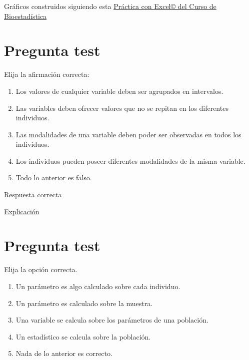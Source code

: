 \documentclass[
]{book}
\providecommand{\tightlist}{%
  \setlength{\itemsep}{0pt}\setlength{\parskip}{0pt}}
\begin{document}
Gráficos construidos siguiendo esta \href{https://1fjmanzano.github.io/bioestadistica/nu\%CC\%81meros-i\%CC\%81ndices.html\#n\%C3\%BAmeros-\%C3\%ADndices-pr\%C3\%A1ctica-con-excel}{Práctica con Excel© del Curso de Bioestadística}

\hypertarget{pregunta-test-19}{%
\section{Pregunta test}\label{pregunta-test-19}}

Elija la afirmación correcta:

\begin{enumerate}
\def\labelenumi{\alph{enumi})}
\tightlist
\item
  Los valores de cualquier variable deben ser agrupados en intervalos.
\item
  Las variables deben ofrecer valores que no se repitan en los diferentes individuos.
\item
  Las modalidades de una variable deben poder ser observadas en todos los individuos.
\item
  Los individuos pueden poseer diferentes modalidades de la misma variable.
\item
  Todo lo anterior es falso.
\end{enumerate}

Respuesta correcta

\href{https://1fjmanzano.github.io/bioestadistica/tipos-de-variables.html}{Explicación}

\hypertarget{pregunta-test-20}{%
\section{Pregunta test}\label{pregunta-test-20}}

Elija la opción correcta.

\begin{enumerate}
\def\labelenumi{\alph{enumi})}
\tightlist
\item
  Un parámetro es algo calculado sobre cada individuo.
\item
  Un parámetro es calculado sobre la muestra.
\item
  Una variable se calcula sobre los parámetros de una población.
\item
  Un estadístico se calcula sobre la población.
\item
  Nada de lo anterior es correcto.
\end{enumerate}
\end{document}

